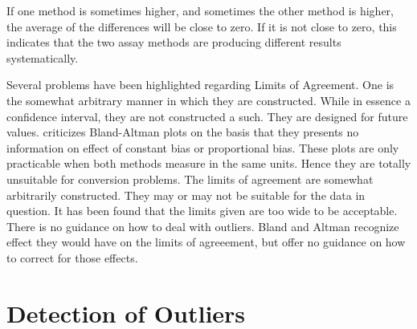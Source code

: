 \documentclass[12pt, a4paper]{report}
\theoremstyle{plain}
\theoremstyle{definition}
\theoremstyle{remark}
\begin{document}
%
%


If one method is sometimes higher, and sometimes the other method is higher, the average of the differences will be close to zero.
If it is not close to zero, this indicates that the two assay methods are producing different results systematically.

Several problems have been highlighted regarding Limits of Agreement. One is the somewhat arbitrary manner in which they are
constructed. While in essence a confidence interval, they are not constructed a such. They are designed for future values.
\citet{ludbrook97,ludbrook02} criticizes Bland-Altman plots on the
basis that they presents no information on effect of constant bias
or proportional bias. These plots are only practicable when both
methods measure in the same units. Hence they are totally
unsuitable for conversion problems. The limits of agreement are
somewhat arbitrarily constructed. They may or may not be suitable
for the data in question. It has been found that the limits given
are too wide to be acceptable. There is no guidance on how to deal
with outliers. Bland and Altman recognize effect they would have
on the limits of agreeement, but offer no guidance on how to
correct for those effects.	


\section{Detection of Outliers}
\end{document}
